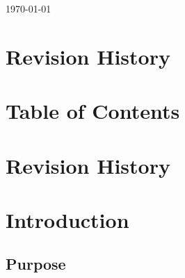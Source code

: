 \documentclass[11pt]{article}
\begin{document}
\begin{titlepage}
	\vfill\vfill\vfill 
	{\large\today} 

	\vfill 

\end{titlepage}


\tableofcontents
\newpage


\section*{Revision History}
\pagebreak


\section{Table of Contents}
\label{sec:toc}

\section{Revision History}
\label{sec:revision}

\section{Introduction}
\label{sec:introduction}

\subsection{Purpose}
\label{sec:purpose}
\end{document}
